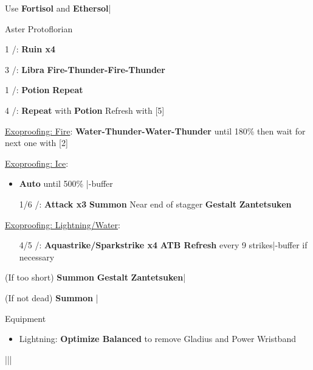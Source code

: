 \begin{mainlist}
	\item Use \textbf{Fortisol} and \textbf{Ethersol}|\skip
\end{mainlist}
\begin{fight}{Aster Protoflorian}
	\item [1] \com/\rav: \textbf{Ruin x4}
	\item [3] \rav/\syn: \textbf{Libra} \to \textbf{Fire-Thunder-Fire-Thunder}
	\item [1] \com/\rav: \textbf{\textbf{Potion}} \to \textbf{Repeat}
	\item [4] \rav/\rav: \textbf{Repeat} with \textbf{Potion} \to Refresh with [5]
	\item \underline{Exoproofing: Fire}: \textbf{Water-Thunder-Water-Thunder} until 180\% then wait for next one with [2]
	\item \underline{Exoproofing: Ice}:
	\begin{itemize}
		\item \textbf{Auto} until 500\% |\com-buffer
		\item [1/6] \com/\rav: \textbf{Attack x3} \to \textbf{Summon} Near end of stagger \to \textbf{Gestalt} \to \textbf{Zantetsuken}
	\end{itemize}
	\item \underline{Exoproofing: Lightning/Water}:
	\begin{itemize}
		\item [4/5] \rav/\rav: \textbf{Aquastrike/Sparkstrike x4} \to \textbf{ATB Refresh} every 9 strikes|\com-buffer if necessary
	\end{itemize}
	\item (If too short) \textbf{Summon} \to \textbf{Gestalt} \to \textbf{Zantetsuken}|\skip
	\item (If not dead) \textbf{Summon} |\skip
\end{fight}
\begin{menu}
	\item Equipment
	\begin{itemize}
		\item Lightning: \textbf{Optimize Balanced} to remove Gladius and Power Wristband
	\end{itemize}
\end{menu}
\begin{mainlist}
	\item \skip|\save||\save
\end{mainlist}
